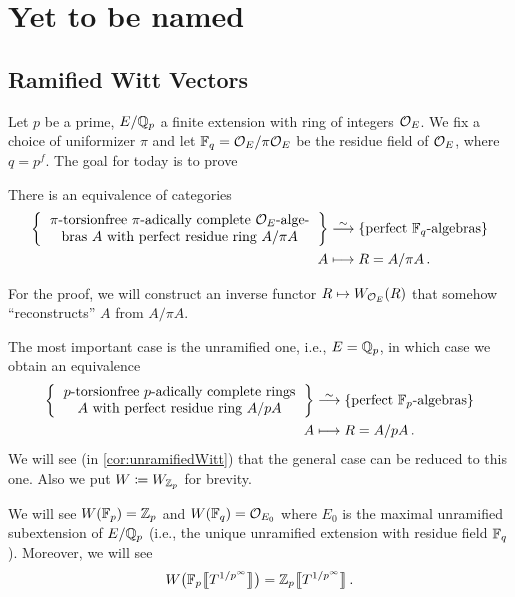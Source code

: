 \chapter{Yet to be named}
\section{Ramified Witt Vectors}
Let $p$ be a prime, $E/\mathbb{Q}_p$ a finite extension with ring of integers $\mathcal{O}_E$. We fix a choice of uniformizer $\pi$ and let $\mathbb{F}_q=\mathcal{O}_E/\pi\mathcal{O}_E$ be the residue field of $\mathcal{O}_E$, where $q=p^f$. The goal for today is to prove
\begin{prop}\label{prop:FqAlgebrasEquivalence}
	There is an equivalence of categories
	\begin{align*}
		\left\{\begin{tabular}{c}
			$\pi$-torsionfree $\pi$-adically complete $\Oo_E$-alge-\\
			bras $A$ with perfect residue ring $A/\pi A$
		\end{tabular}
		\right\}&\isomorphism\left\{\text{perfect $\IF_q$-algebras}\right\}\\
		A&\longmapsto R=A/\pi A\,.
	\end{align*}
\end{prop}
For the proof, we will construct an inverse functor $R\mapsto W_{\mathcal{O}_E}(R)$ that somehow \enquote{reconstructs} $A$ from $A/\pi A$.
\begin{rem}
	The most important case is the unramified one, i.e., $E=\mathbb{Q}_p$, in which case we obtain an equivalence
	\begin{align*}
	\left\{\begin{tabular}{c}
	$p$-torsionfree $p$-adically complete rings\\
	$A$ with perfect residue ring $A/pA$
	\end{tabular}
	\right\}&\isomorphism\left\{\text{perfect $\IF_p$-algebras}\right\}\\
	A&\longmapsto R=A/p A\,.
	\end{align*}
	We will see (in \cref{cor:unramifiedWitt}) that the general case can be reduced to this one. Also we put $W\coloneqq W_{\mathbb{Z}_p}$ for brevity.
\end{rem}
We will see $W(\mathbb{F}_p)=\mathbb{Z}_p$ and $W(\mathbb{F}_q)=\mathcal{O}_{E_0}$ where $E_0$ is the maximal unramified subextension of $E/\mathbb{Q}_p$ (i.e., the unique unramified extension with residue field $\mathbb{F}_q$). Moreover, we will see
	\begin{equation*}
		W\big(\mathbb{F}_p\big\llbracket T^{1/p^\infty}\big\rrbracket\big)=\mathbb{Z}_p\big\llbracket T^{1/p^\infty}\big\rrbracket\,.
	\end{equation*}
	
